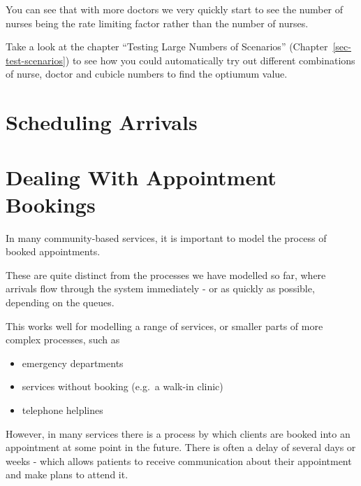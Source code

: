 \documentclass[
  letterpaper,
  DIV=11,
  numbers=noendperiod]{scrreprt}
\providecommand{\tightlist}{%
  \setlength{\itemsep}{0pt}\setlength{\parskip}{0pt}}\usepackage{longtable,booktabs,array}
\begin{document}
You can see that with more doctors we very quickly start to see the
number of nurses being the rate limiting factor rather than the number
of nurses.

\begin{tcolorbox}[enhanced jigsaw, rightrule=.15mm, colback=white, colframe=quarto-callout-note-color-frame, colbacktitle=quarto-callout-note-color!10!white, toprule=.15mm, coltitle=black, opacityback=0, titlerule=0mm, bottomtitle=1mm, breakable, title=\textcolor{quarto-callout-note-color}{\faInfo}\hspace{0.5em}{Note}, opacitybacktitle=0.6, toptitle=1mm, arc=.35mm, bottomrule=.15mm, leftrule=.75mm, left=2mm]

Take a look at the chapter ``Testing Large Numbers of Scenarios''
(Chapter~\ref{sec-test-scenarios}) to see how you could automatically
try out different combinations of nurse, doctor and cubicle numbers to
find the optiumum value.

\end{tcolorbox}

\chapter{Scheduling Arrivals}\label{scheduling-arrivals}

\chapter{Dealing With Appointment
Bookings}\label{dealing-with-appointment-bookings}

In many community-based services, it is important to model the process
of booked appointments.

These are quite distinct from the processes we have modelled so far,
where arrivals flow through the system immediately - or as quickly as
possible, depending on the queues.

This works well for modelling a range of services, or smaller parts of
more complex processes, such as

\begin{itemize}
\tightlist
\item
  emergency departments
\item
  services without booking (e.g.~a walk-in clinic)
\item
  telephone helplines
\end{itemize}

However, in many services there is a process by which clients are booked
into an appointment at some point in the future. There is often a delay
of several days or weeks - which allows patients to receive
communication about their appointment and make plans to attend it.
\end{document}

